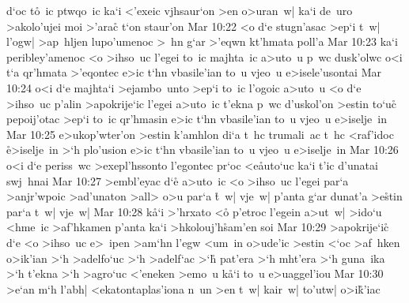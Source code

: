 d`oc
t\r{o}~ic
ptwqo~ic
ka`i
<'exeic
vjhsaur`on
>en
o>uran~w|
ka`i
de~uro
>akolo'ujei
moi
>'arac\r{}
t`on
staur'on\bibvsend
\vs Mar 10:22
<o
d`e
stugn'asac
>ep`i
t~w|
l'ogw|
>ap~hljen
lupo'umenoc
>~hn
g`ar
>'eqwn
kt'hmata
poll'a\bibvsend
\vs Mar 10:23
ka`i
peribley'amenoc
<o
>ihso~uc
l'egei
to~ic
majhta~ic
a>uto~u
p~wc
dusk'olwc
o<i
t`a
qr'hmata
>'eqontec
e>ic
t`hn
vbasile'ian
to~u
vjeo~u
e>isele'usontai\bibvsend
\vs Mar 10:24
o<i
d`e
majhta`i
>ejambo~unto
>ep`i
to~ic
l'ogoic
a>uto~u
<o
d`e
>ihso~uc
p'alin
>apokrije`ic
l'egei
a>uto~ic
t'ekna
p~wc
d'uskol'on
>estin
to`uc\r{}
pepoij'otac
>ep`i
to~ic
qr'hmasin
e>ic
t`hn
vbasile'ian
to~u
vjeo~u
e>iselje~in\bibvsend
\vs Mar 10:25
e>ukop'wter'on
>estin
k'amhlon
di`a
t~hc
trumali~ac
t~hc
<raf'idoc
\r{e}>iselje~in
>`h
plo'usion
e>ic
t`hn
vbasile'ian
to~u
vjeo~u
e>iselje~in\bibvsend
\vs Mar 10:26
o<i
d`e
periss~wc
>exepl'hssonto
l'egontec
pr`oc
<e\r{a}uto`uc
ka`i
t'ic
d'unatai
swj~hnai\bibvsend
\vs Mar 10:27
>embl'eyac
d`e\r{}
a>uto~ic
<o
>ihso~uc
l'egei
par`a
>anjr'wpoic
>ad'unaton
>all>
o>u
par`a
\r{t}~w|
vje~w|
p'anta
g`ar
dunat'a
>e\r{s}tin
par`a
t~w|
vje~w|\bibvsend
\vs Mar 10:28
k\r{a}`i
>'hrxato
<o\r{}
p'etroc
l'egein
a>ut~w|
>ido`u
<hme~ic
>af'hkamen
p'anta
ka`i
>hkolouj'h\r{s}am'en
soi\bibvsend
\vs Mar 10:29
>apokrije`ic\r{}
d`e
<o
>ihso~uc
e>~ipen
>am`hn
l'egw
<um~in
o>ude'ic
>estin
<`oc
>af~hken
o>ik'ian
>`h
>adelfo`uc
>`h
>adelf`ac
>`h\r{}
pat'era
>`h
mht'era
>`h
guna~ika
>`h
t'ekna
>`h
>agro`uc
<'eneken
>emo~u
k\r{a}`i
to~u
e>uaggel'iou\bibvsend
\vs Mar 10:30
>e`an
m`h
l'abh|
<ekatontaplas'iona
n~un
>en
t~w|
kair~w|
to'utw|
o>i\r{k}'iac
